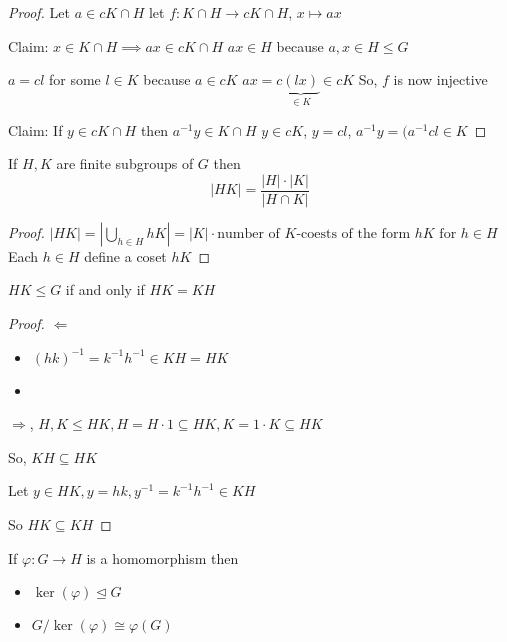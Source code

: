 \begin{proof}
  Let $a \in cK \cap H$ let $f : K \cap H \to cK \cap H$, $x \mapsto ax$

  Claim: $x\in K \cap H \implies ax \in cK \cap H$
  $ax \in H$ because $a, x \in H \le G$

  $a = cl$ for some $l \in K$ because $a \in cK$
  $ax = c\underbrace{(lx)}_{\in K} \in cK$
  So, $f$ is now injective

  Claim: If $y \in cK \cap H$ then $a^{-1}y \in K \cap H$
  $y \in cK$, $y = cl$, $a^{-1}y = (a^{-1}cl \in K$

\end{proof}

\begin{theorem}
  If $H, K$ are finite subgroups of $G$ then 
  \[|HK| = \frac{|H|\cdot|K|}{|H \cap K|}\]
\end{theorem}

\begin{proof}
  $|HK| = |\displaystyle\bigcup_{h \in H} hK| = |K| \cdot \text{number of $K$-coests of the form $hK$ for $h \in H$}$
  Each $h \in H$ define a coset $hK$
\end{proof}

\begin{proposition}
  $HK \le G$ if and only if $HK = KH$
\end{proposition}

\begin{proof}
  $\Leftarrow$
  \begin{itemize}
    \item $(hk)^{-1} = k^{-1}h^{-1} \in KH = HK$
    \item 
  \end{itemize}
  $\Rightarrow$, $H, K \le HK, H = H\cdot 1 \subseteq HK, K = 1\cdot K \subseteq HK$

  So, $KH \subseteq HK$

  Let $y \in HK, y = hk, y^{-1} = k^{-1}h^{-1} \in KH$

  So $HK \subseteq KH$
\end{proof}

\begin{theorem}
  If $\varphi: G \to H$ is a homomorphism then
  \begin{itemize}
    \item $\ker(\varphi) \trianglelefteq G$
    \item $G/\ker(\varphi) \cong \varphi(G)$
  \end{itemize} 
\end{theorem}


